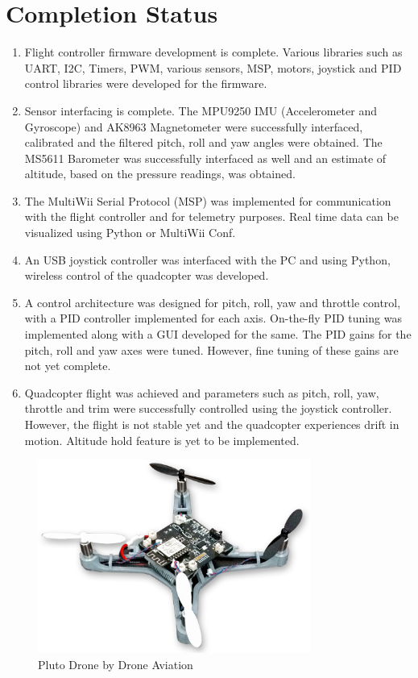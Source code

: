 \documentclass[a4paper,12pt,oneside]{book}
\begin{document}
\section{Completion Status}
\begin{enumerate}
\item Flight controller firmware development is complete. Various libraries such as UART, I2C, Timers, PWM, various sensors, MSP, motors, joystick and PID control libraries were developed for the firmware.

\item Sensor interfacing is complete. The MPU9250 IMU (Accelerometer and Gyroscope) and AK8963 Magnetometer were successfully interfaced, calibrated and the filtered pitch, roll and yaw angles were obtained. The MS5611 Barometer was successfully interfaced as well and an estimate of altitude, based on the pressure readings, was obtained.

\item The MultiWii Serial Protocol (MSP) was implemented for communication with the flight controller and for telemetry purposes. Real time data can be visualized using Python or MultiWii Conf.

\item An USB joystick controller was interfaced with the PC and using Python, wireless control of the quadcopter was developed.

\item A control architecture was designed for pitch, roll, yaw and throttle  control, with a PID controller implemented for each axis. On-the-fly PID tuning was implemented along with a GUI developed for the same. The PID gains for the pitch, roll and yaw axes were tuned. However, fine tuning of these gains are not yet complete.

\item Quadcopter flight was achieved and parameters such as pitch, roll, yaw, throttle and trim were successfully controlled using the joystick controller. However, the flight is not stable yet and the quadcopter experiences drift in motion. Altitude hold feature is yet to be implemented.\\
\end{enumerate}

\begin{figure}[!htb]
\centering
\includegraphics[width=0.8\textwidth]{images/pluto_drone}
\caption{Pluto Drone by Drone Aviation}
\end{figure}
\end{document}
